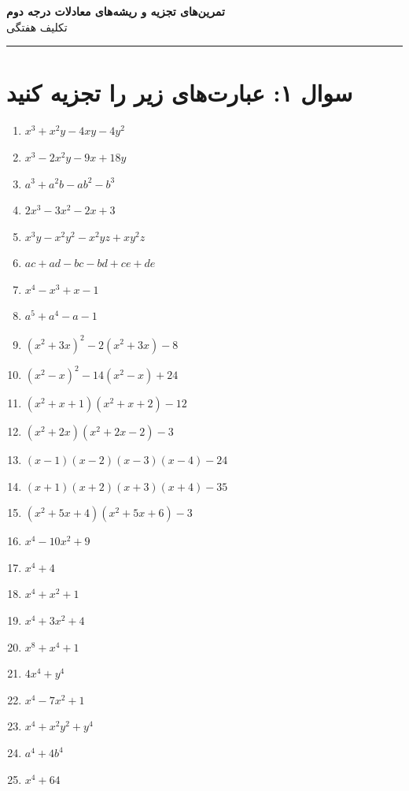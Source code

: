 \documentclass[12pt,a4paper]{article}
\begin{document}
\begin{center}
{\Large\bfseries تمرین‌های تجزیه و ریشه‌های معادلات درجه دوم}\\[0.5em]
{\large تکلیف هفتگی}
\end{center}

\vspace{1em}
\hrule
\vspace{1.5em}

\section*{سوال ۱: عبارت‌های زیر را تجزیه کنید}

\begin{enumerate}
\item $x^3 + x^2 y - 4xy - 4y^2$
\item $x^3 - 2x^2 y - 9x + 18y$
\item $a^3 + a^2 b - ab^2 - b^3$
\item $2x^3 - 3x^2 - 2x + 3$
\item $x^3 y - x^2 y^2 - x^2 yz + xy^2 z$
\item $ac + ad - bc - bd + ce + de$
\item $x^4 - x^3 + x - 1$
\item $a^5 + a^4 - a - 1$
\item $(x^2 + 3x)^2 - 2(x^2 + 3x) - 8$
\item $(x^2 - x)^2 - 14(x^2 - x) + 24$
\item $(x^2 + x + 1)(x^2 + x + 2) - 12$
\item $(x^2 + 2x)(x^2 + 2x - 2) - 3$
\item $(x-1)(x-2)(x-3)(x-4) - 24$
\item $(x+1)(x+2)(x+3)(x+4) - 35$
\item $(x^2 + 5x + 4)(x^2 + 5x + 6) - 3$
\item $x^4 - 10x^2 + 9$
\item $x^4 + 4$
\item $x^4 + x^2 + 1$
\item $x^4 + 3x^2 + 4$
\item $x^8 + x^4 + 1$
\item $4x^4 + y^4$
\item $x^4 - 7x^2 + 1$
\item $x^4 + x^2 y^2 + y^4$
\item $a^4 + 4b^4$
\item $x^4 + 64$

\end{enumerate}
\end{document}
